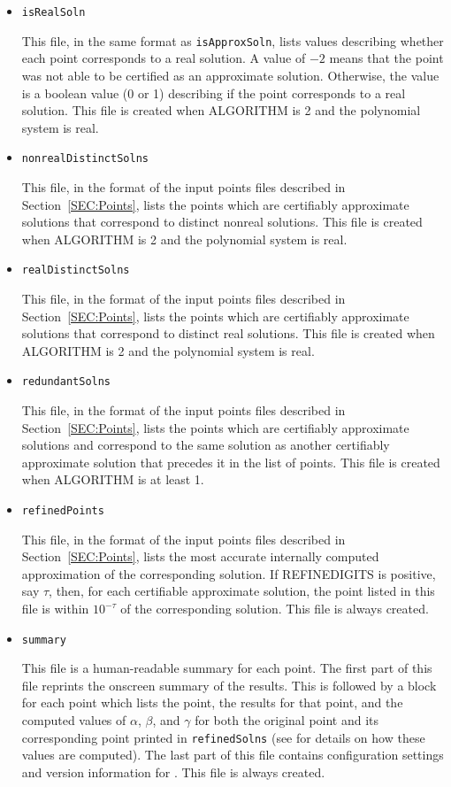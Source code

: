 \documentclass[11pt]{report}
\begin{document}
\begin{itemize}
\item {\tt isRealSoln}

This file, in the same format as {\tt isApproxSoln}, lists values describing whether
each point corresponds to a real solution.  A value of $-2$ means that the point
was not able to be certified as an approximate solution.  Otherwise,
the value is a boolean value (0 or 1) describing if the point corresponds to a real solution.
This file is created when ALGORITHM
is 2 and the polynomial system is real.

\item {\tt nonrealDistinctSolns}

This file, in the format of the input points files described in Section~\ref{SEC:Points},
lists the points which are certifiably approximate solutions that correspond to distinct
nonreal solutions.  This file is created when ALGORITHM is 2 and the polynomial system is real.

\item {\tt realDistinctSolns}

This file, in the format of the input points files described in Section~\ref{SEC:Points},
lists the points which are certifiably approximate solutions that correspond to distinct
real solutions.  This file is created when ALGORITHM is 2 and the polynomial system is real.

\item {\tt redundantSolns}

This file, in the format of the input points files described in Section~\ref{SEC:Points},
lists the points which are certifiably approximate solutions and correspond
to the same solution as another certifiably approximate solution that precedes
it in the list of points.  This file is created when ALGORITHM is at least 1.

\item {\tt refinedPoints}

This file, in the format of the input points files described in Section~\ref{SEC:Points},
lists the most accurate internally computed approximation of the corresponding solution.
If REFINEDIGITS is positive, say $\tau$, then, for each certifiable approximate solution,
the point listed in this file is within $10^{-\tau}$ of the corresponding solution.
This file is always created.

\item {\tt summary}

This file is a human-readable summary for each point.  The first part of this file
reprints the onscreen summary of the results.  This is followed by a block for each
point which lists the point, the results for that point, and the
computed values of $\alpha$, $\beta$, and $\gamma$ for both the original point and its
corresponding point printed in {\tt refinedSolns} (see \cite{HS10} for details on how these values are computed).
The last part of this file contains configuration settings and version information for \blueharvest.
This file is always created.


\end{itemize}
\end{document}
